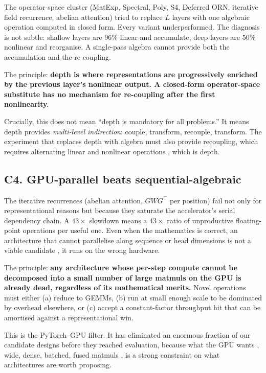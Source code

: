 \documentclass[11pt, a4paper]{article}
\begin{document}
The operator-space cluster (MatExp, Spectral, Poly, S4, Deferred ORN, iterative field recurrence, abelian attention) tried to replace $L$ layers with one algebraic operation computed in closed form. Every variant underperformed. The diagnosis is not subtle: shallow layers are 96\% linear and accumulate; deep layers are 50\% nonlinear and reorganise. A single-pass algebra cannot provide both the accumulation and the re-coupling.

The principle: \textbf{depth is where representations are progressively enriched by the previous layer's nonlinear output. A closed-form operator-space substitute has no mechanism for re-coupling after the first nonlinearity.}

Crucially, this does not mean ``depth is mandatory for all problems.'' It means depth provides \emph{multi-level indirection}: couple, transform, recouple, transform. The experiment that replaces depth with algebra must also provide recoupling, which requires alternating linear and nonlinear operations ,  which is depth.

\subsection{C4. GPU-parallel beats sequential-algebraic}

The iterative recurrences (abelian attention, $G W G^\top$ per position) fail not only for representational reasons but because they saturate the accelerator's serial dependency chain. A $43\times$ slowdown means a $43\times$ ratio of unproductive floating-point operations per useful one. Even when the mathematics is correct, an architecture that cannot parallelise along sequence or head dimensions is not a viable candidate ,  it runs on the wrong hardware.

The principle: \textbf{any architecture whose per-step compute cannot be decomposed into a small number of large matmuls on the GPU is already dead, regardless of its mathematical merits.} Novel operations must either (a) reduce to GEMMs, (b) run at small enough scale to be dominated by overhead elsewhere, or (c) accept a constant-factor throughput hit that can be amortised against a representational win.

This is the PyTorch--GPU filter. It has eliminated an enormous fraction of our candidate designs before they reached evaluation, because what the GPU wants ,  wide, dense, batched, fused matmuls ,  is a strong constraint on what architectures are worth proposing.
\end{document}
